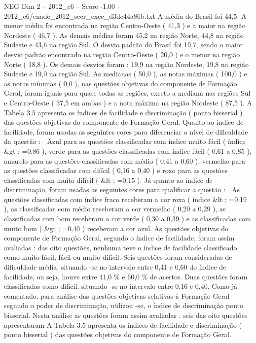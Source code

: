 \begin{textsample}{NEG Dim 2 – 2012\_c6 – Score -1.00 – 2012\_c6/enade\_2012\_secr\_exec\_d3dc44a86b.txt}
A média do Brasil foi 44,5.
A menor média foi encontrada na região Centro-Oeste ( 41,3 ) e a maior na região Nordeste ( 46,7 ).
As demais médias foram 45,2 na região Norte, 44,8 na região Sudeste e 43,6 na região Sul.
O desvio padrão do Brasil foi 19,7, sendo o maior desvio padrão encontrado na região Centro-Oeste ( 20,0 ) e o menor na região Norte ( 18,8 ).
Os demais desvios foram : 19,9 na região Nordeste, 19,8 na região Sudeste e 19,0 na região Sul.
As medianas ( 50,0 ), as notas máximas ( 100,0 ) e as notas mínimas ( 0,0 ), nas questões objetivas do componente de Formação Geral, foram iguais para quase todas as regiões, exceto a mediana nas regiões Sul e Centro-Oeste ( 37,5 em ambas ) e a nota máxima na região Nordeste ( 87,5 ).
A Tabela 3.5 apresenta os índices de facilidade e discriminação ( ponto bisserial ) das questões objetivas do componente de Formação Geral.
Quanto ao índice de facilidade, foram usadas as seguintes cores para diferenciar o nível de dificuldade da questão :  Azul para as questões classificadas com índice muito fácil ( índice \&gt ; =0,86 ), verde para as questões classificadas com índice fácil ( 0,61 a 0,85 ), amarelo para as questões classificadas com médio ( 0,41 a 0,60 ), vermelho para as questões classificadas com difícil ( 0,16 a 0,40 ) e roxo para as questões classificadas com muito difícil ( \&lt ; =0,15 ).
Já quanto ao índice de discriminação, foram usadas as seguintes cores para qualificar a questão :  As questões classificadas com índice fraco receberam a cor roxa ( índice \&lt ; =0,19 ), as classificadas com médio receberam a cor vermelho ( 0,20 a 0,29 ), as classificadas com bom receberam a cor verde ( 0,30 a 0,39 ) e as classificadas com muito bom ( \&gt ; =0,40 ) receberam a cor azul.
As questões objetivas do componente de Formação Geral, segundo o índice de facilidade, foram assim avaliadas : das oito questões, nenhuma teve o índice de facilidade classificado como muito fácil, fácil ou muito difícil.
Seis questões foram consideradas de dificuldade média, situando -se no intervalo entre 0,41 e 0,60 do índice de facilidade, ou seja, houve entre 41,0 \% e 60,0 \% de acertos.
Duas questões foram classificadas como difícil, situando -se no intervalo entre 0,16 e 0,40.
Como já comentado, para análise das questões objetivas relativas à Formação Geral segundo o poder de discriminação, utilizou -se, o índice de discriminação ponto bisserial.
Nesta análise as questões foram assim avaliadas : seis das oito questões apresentaram A Tabela 3.5 apresenta os índices de facilidade e discriminação ( ponto bisserial ) das questões objetivas do componente de Formação Geral.

\end{textsample}
